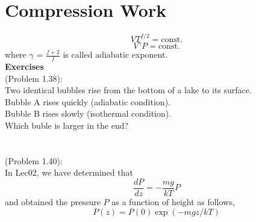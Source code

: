 

\section{Compression Work}

\begin{equation} \label{duw5} VT^{f/2} = \textrm{const}. \end{equation}
\begin{equation} \label{duw6} V^{\gamma}P = \textrm{const}. \end{equation}
where ${\gamma}$ = $\frac{f+2}{f}$ is called adiabatic exponent.\\

{\bf Exercises}\\
(Problem 1.38):\\
Two identical bubbles rise from the bottom of a lake to its surface.\\
Bubble A rises quickly (adiabatic condition).\\
Bubble B rises slowly (isothermal condition).\\
Which buble is larger in the end?
 \\\\\\

(Problem 1.40):\\
In Lec02, we have determined that 
  \begin{equation} \frac{dP}{dz} = -\frac{mg}{kT} P \end{equation}
and obtained the pressure $P$ as a function of height as follows,
  \begin{equation} P(z) = P(0) \exp(-mgz/kT) \end{equation}

